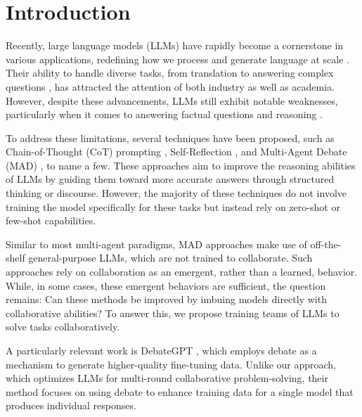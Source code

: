 \section{Introduction}
\begingroup
\renewcommand{\thefootnote}{}
\endgroup
Recently, large language models (LLMs) have rapidly become a cornerstone in various applications, redefining how we process and generate language at scale \citep{thirunavukarasu2023large,hadi2023survey,jiang2024megascale}. Their ability to handle diverse tasks, from translation \citep{zhu2024multilingualmachinetranslationlarge, otter2020survey} to answering complex questions \citep{zhang2024llm, hao2024llm, havrilla2024glore}, has attracted the attention of both industry as well as academia. 
However, despite these advancements, LLMs still exhibit notable weaknesses, particularly when it comes to answering factual questions and reasoning \citep{tonmoy2024comprehensive, rawte2023survey, huang2023survey}. 

To address these limitations, several techniques have been proposed, such as Chain-of-Thought (CoT) prompting \citep{wei2022chain}, Self-Reflection \citep{ji2023towards,shinn2023reflexionlanguageagentsverbal}, and Multi-Agent Debate (MAD) \citep{du2023improving}, to name a few. 
These approaches aim to improve the reasoning abilities of LLMs by guiding them toward more accurate answers through structured thinking or discourse. 
However, the majority of these techniques do not involve training the model specifically for these tasks but instead rely on zero-shot or few-shot capabilities. 

Similar to most multi-agent paradigms, MAD approaches make use of off-the-shelf general-purpose LLMs, which are not trained to collaborate.
Such approaches rely on collaboration as an emergent, rather than a learned, behavior. 
While, in some cases, these emergent behaviors are sufficient, the question remains: Can these methods be improved by imbuing models directly with collaborative abilities? To answer this, we propose training teams of LLMs to solve tasks collaboratively.

A particularly relevant work is DebateGPT \citep{subramaniam2024debategpt}, which employs debate as a mechanism to generate higher-quality fine-tuning data. Unlike our approach, which optimizes LLMs for multi-round collaborative problem-solving, their method focuses on using debate to enhance training data for a single model that produces individual responses.


